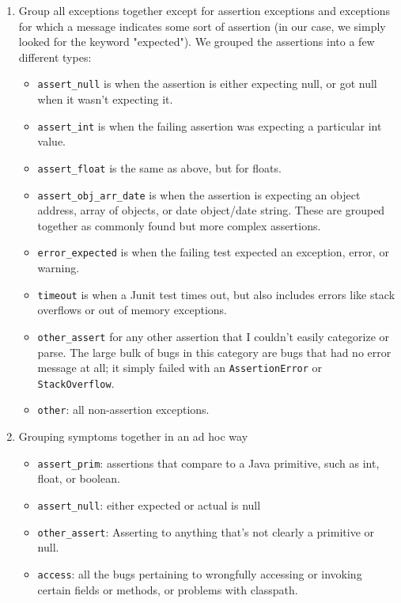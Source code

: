 \begin{enumerate}
	\item Group all exceptions together except for assertion exceptions and exceptions for which a message indicates some sort of assertion (in our case, we simply looked for the keyword "expected"). We grouped the assertions into a few different types:
	\begin{itemize}
		\item \lstinline{assert_null} is when the assertion is either expecting null, or got null when it wasn't expecting it.
		\item \lstinline{assert_int} is when the failing assertion was expecting a particular int value.
		\item \lstinline{assert_float} is the same as above, but for floats.
		\item \lstinline{assert_obj_arr_date} is when the assertion is expecting an object address, array of objects, or date object/date string. These are grouped together as commonly found but more complex assertions.
		\item \lstinline{error_expected} is when the failing test expected an exception, error, or warning.
		\item \lstinline{timeout} is when a Junit test times out, but also includes errors like stack overflows or out of memory exceptions.
		\item \lstinline{other_assert} for any other assertion that I couldn't easily categorize or parse. The large bulk of bugs in this category are bugs that had no error message at all; it simply failed with an \lstinline{AssertionError} or \lstinline{StackOverflow}.
		\item \lstinline{other}: all non-assertion exceptions.
	\end{itemize}
	\item Grouping symptoms together in an ad hoc way 
	\begin{itemize}
		\item \lstinline{assert_prim}: assertions that compare to a Java primitive, such as int, float, or boolean.
		\item \lstinline{assert_null}: either expected or actual is null
		\item \lstinline{other_assert}: Asserting to anything that's not clearly a primitive or null.
		\item \lstinline{access}: all the bugs pertaining to wrongfully accessing or invoking certain fields or methods, or problems with classpath.

\end{itemize}
\end{enumerate}
